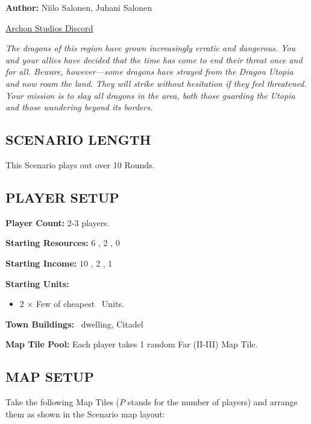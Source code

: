 
\begin{multicols*}{2}

\textbf{Author:} Niilo Salonen, Juhani Salonen

\href{https://discord.com/channels/740870068178649108/1161571991732625468/threads/1432372875658137752}{Archon Studios Discord}

\textit{The dragons of this region have grown increasingly erratic and dangerous. You and your allies have decided that the time has come to end their threat once and for all. Beware, however—some dragons have strayed from the
Dragon Utopia and now roam the land. They will strike without hesitation if they feel threatened. Your mission
is to slay all dragons in the area, both those guarding the Utopia and those wandering beyond its borders.}  %

\subsection*{\MakeUppercase{Scenario Length}}
This Scenario plays out over 10 Rounds.

\subsection*{\MakeUppercase{Player Setup}}
\textbf{Player Count:} 2-3 players.

\textbf{Starting Resources:} 6 , 2 , 0 

\textbf{Starting Income:} 10 , 2 , 1 

\textbf{Starting Units:}

\begin{itemize}
  \item 2 × Few of cheapest \bronze\ Units.
\end{itemize}

\textbf{Town Buildings:} \bronze\ dwelling, Citadel

\textbf{Map Tile Pool:} Each player takes 1 random Far (II-III) Map Tile.

\subsection*{\MakeUppercase{Map Setup}}
Take the following Map Tiles ($P$ stands for the number of players) and arrange them as shown in the Scenario map layout:



\end{multicols*}
